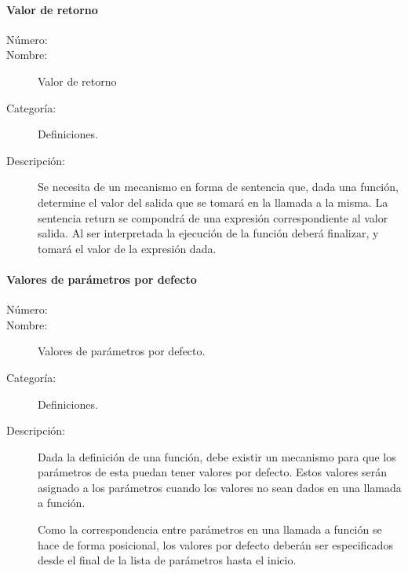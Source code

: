 \paragraph{Valor de retorno}
\begin{framed}
	\begin{description}
		\item [Número:] \cn
		\item [Nombre:] Valor de retorno
		\item [Categoría:] Definiciones.
		\item [Descripción:] Se necesita de un mecanismo en forma de sentencia que, dada una función, determine
		el valor del salida que se tomará en la llamada a la misma. La sentencia return se compondrá de una 
		expresión correspondiente al valor salida. Al ser interpretada la ejecución de
		la función deberá finalizar, y tomará el valor de la expresión dada.
	\end{description}
\end{framed}

\paragraph{Valores de parámetros por defecto}
\begin{framed}
	\begin{description}
		\item [Número:] \cn
		\item [Nombre:] Valores de parámetros por defecto.
		\item [Categoría:] Definiciones.
		\item [Descripción:] Dada la definición de una función, debe existir un mecanismo para que los parámetros de esta puedan tener 
		valores por defecto. Estos valores serán asignado a los parámetros cuando los valores no sean dados en una llamada a función. 
		
		Como la correspondencia entre parámetros en una llamada a función se hace de forma posicional, los valores por defecto deberán ser especificados 
		desde el final de la lista de parámetros hasta el inicio.
	\end{description}
\end{framed}

